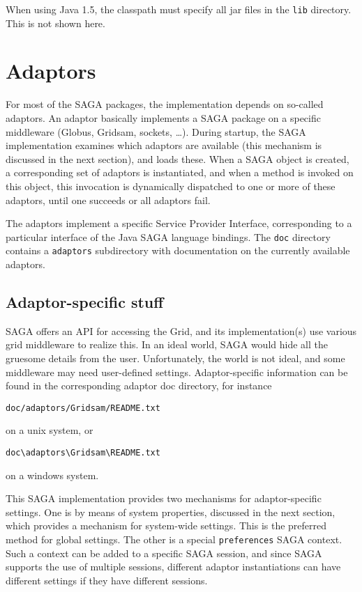 \documentclass[a4paper,10pt]{article}
\begin{document}
When using Java 1.5, the classpath must specify all jar files in the
\texttt{lib} directory. This is not shown here.

\section{Adaptors}

For most of the SAGA packages, the implementation depends on so-called
adaptors. An adaptor basically implements a SAGA package on a specific
middleware (Globus, Gridsam, sockets, \ldots).
During startup, the SAGA implementation examines which adaptors are
available (this mechanism is discussed in the next section), and loads
these. When a SAGA object is created, a corresponding set of adaptors
is instantiated, and when a
method is invoked on this object, this invocation is dynamically
dispatched to one or more of these adaptors, until one succeeds
or all adaptors fail.

The adaptors implement a specific Service Provider Interface,
corresponding to a particular interface of the Java SAGA language bindings.
The \texttt{doc} directory contains a \texttt{adaptors} subdirectory
with documentation on the currently available adaptors.

\subsection{Adaptor-specific stuff}

SAGA offers an API for accessing the Grid, and its implementation(s) use
various grid middleware to realize this. In an ideal world, SAGA would hide
all the gruesome details from the user. Unfortunately, the world is not
ideal, and some middleware may need user-defined settings.
Adaptor-specific information can be found in the corresponding adaptor
doc directory, for instance
\noindent
{\small
\begin{verbatim}
doc/adaptors/Gridsam/README.txt
\end{verbatim}
}
\noindent
on a unix system, or
\noindent
{\small
\begin{verbatim}
doc\adaptors\Gridsam\README.txt
\end{verbatim}
}
\noindent
on a windows system.

This SAGA implementation provides two mechanisms for adaptor-specific
settings.
One is by means of system properties, discussed in the
next section, which provides a mechanism for system-wide settings.
This is the preferred method for global settings.
The other is a special \texttt{preferences} SAGA context.
Such a context can be added to a specific SAGA session, and since SAGA
supports the use of multiple sessions, different adaptor instantiations
can have different settings if they have different sessions.
\end{document}
